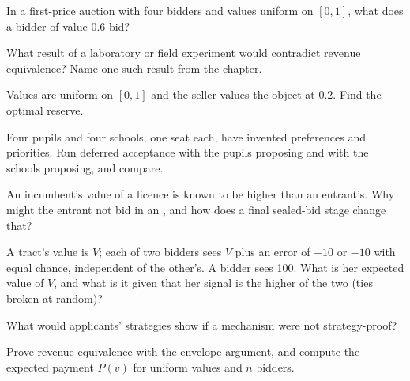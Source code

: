 \begin{exercise}[$\star$]\label{exo:b3:auctions-and-market-design:3}
In a first-price auction with four bidders and values uniform on $[0, 1]$, what does a bidder of
value 0.6 bid?
\end{exercise}

\begin{exercise}[$\star$]\label{exo:b3:auctions-and-market-design:4}
What result of a laboratory or field experiment would contradict revenue
equivalence? Name one such result from the chapter.
\end{exercise}

\begin{exercise}[$\star\star$]\label{exo:b3:auctions-and-market-design:5}
Values are uniform on $[0, 1]$ and the seller values the object at 0.2. Find the optimal reserve.
\end{exercise}

\begin{exercise}[$\star\star$]\label{exo:b3:auctions-and-market-design:6}
Four pupils and four schools, one seat each, have invented preferences and
priorities. Run deferred acceptance with the pupils proposing and with the schools
proposing, and compare.
\end{exercise}

\begin{exercise}[$\star\star$]\label{exo:b3:auctions-and-market-design:7}
An incumbent's value of a licence is known to be higher than an entrant's. Why might
the entrant not bid in an , and how does a final sealed-bid stage
change that?
\end{exercise}

\begin{exercise}[$\star\star$]\label{exo:b3:auctions-and-market-design:8}
A tract's value is $V$; each of two bidders sees $V$ plus an error of $+10$ or $-10$ with equal chance,
independent of the other's. A bidder sees 100. What is her expected value of $V$, and what is it
given that her signal is the higher of the two (ties broken at random)?
\end{exercise}

\begin{exercise}[$\star\star$]\label{exo:b3:auctions-and-market-design:9}
What would applicants' strategies show if a mechanism were not strategy-proof?
\end{exercise}

\begin{exercise}[$\star\star\star$]\label{exo:b3:auctions-and-market-design:10}
Prove revenue equivalence with the envelope argument, and compute the expected
payment $P(v)$ for uniform values and $n$ bidders.
\end{exercise}

